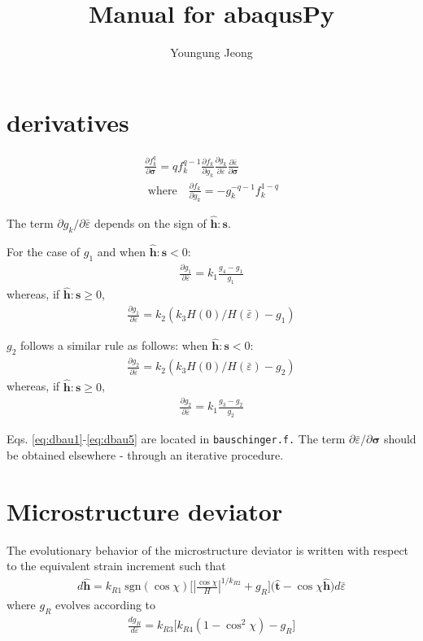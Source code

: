 \documentclass[12pt]{amsart}
\author{Youngung Jeong}
\title{Manual for abaqusPy}
\begin{document}
\pgfplotsset{compat=1.14}


\section{derivatives}

\begin{eqnarray}
  \label{eq:dbau1}
  \frac{\partial{f_k^q}}{\partial{\mathbf{\sigma}}} = q f_k^{q-1} \frac{\partial{f_k}}{\partial{g_k}}   \frac{\partial{g_k}}{\partial{\bar{\varepsilon}}}   \frac{\partial{\bar{\varepsilon}}}{\partial{\mathbf{\sigma}}}\\
  \text{ where      }\ \ \  \frac{\partial{f_k}}{\partial{g_k}} = -g_k^{-q-1} f_k ^{1-q}
\end{eqnarray}

The term $  \partial{g_k}/\partial{\bar{\varepsilon}} $ depends on the sign of $\hat{\mathbf{h}}:\mathbf{s}$.

For the case of $g_1$ and when  $\hat{\mathbf{h}}:\mathbf{s}<0$:
\begin{eqnarray}
  \label{eq:dbau2}
\frac{\partial{g_1}}{\partial{\bar{\varepsilon}}}=k_1 \frac{g_4-g_1}{g_1}
\end{eqnarray}
whereas, if $\hat{\mathbf{h}}:\mathbf{s}\ge0$,
\begin{eqnarray}
  \label{eq:dbau3}
\frac{\partial{g_1}}{\partial{\bar{\varepsilon}}}=k_2 (k_3 H(0)/H(\bar{\varepsilon})-g_1)
\end{eqnarray}


$g_2$ follows a similar rule as follows:
when  $\hat{\mathbf{h}}:\mathbf{s}<0$:
\begin{eqnarray}
  \label{eq:dbau4}
  \frac{\partial{g_2}}{\partial{\bar{\varepsilon}}}=k_2 (k_3 H(0)/H(\bar{\varepsilon})-g_2)
\end{eqnarray}
whereas, if $\hat{\mathbf{h}}:\mathbf{s}\ge0$,
\begin{eqnarray}
  \label{eq:dbau5}
\frac{\partial{g_2}}{\partial{\bar{\varepsilon}}}=k_1 \frac{g_3-g_2}{g_2}
\end{eqnarray}

Eqs. \ref{eq:dbau1}-\ref{eq:dbau5} are located in \verb$bauschinger.f.$
The term $\partial{\bar{\varepsilon}}/\partial{\mathbf{\sigma}}$ should be obtained elsewhere - through an iterative procedure.

\section{Microstructure deviator}
The evolutionary behavior of the microstructure deviator is written with respect to the equivalent strain increment such that
\begin{eqnarray}
  \label{eq:dmicro1}
  d\hat{\mathbf{h}} = k_{R1}\ \text{sgn}(\cos\chi)\big[|\frac{\cos\chi}{H}|^{1/k_{R2}} +g_R \big] \big(\hat{\mathbf{t}}-\cos\chi \hat{\mathbf{h}}\big)d\bar{\varepsilon}
\end{eqnarray}
where $g_R$ evolves according to
\begin{eqnarray}
  \label{eq:dmicro2}
\frac{dg_R}{d\bar{\varepsilon}} = k_{R3} \big[k_{R4} (1-\cos^2\chi) -g_R \big]
\end{eqnarray}
\end{document}
